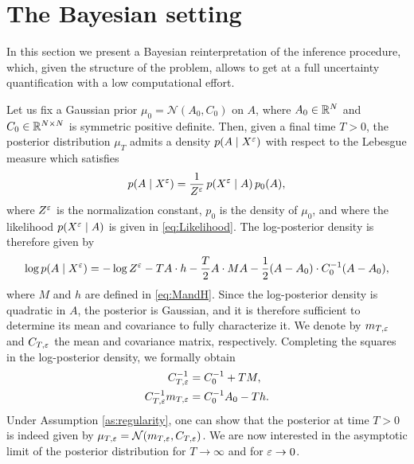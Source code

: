 \documentclass[10pt]{article}
\begin{document}
\section{The Bayesian setting}\label{sec:Bayesian}

In this section we present a Bayesian reinterpretation of the inference procedure, which, given the structure of the problem, allows to get at a full uncertainty quantification with a low computational effort. 

Let us fix a Gaussian prior $\mu_0 = \mathcal N(A_0, C_0)$ on $A$, where $A_0 \in \mathbb{R}^N$ and $C_0 \in \mathbb{R}^{N\times N}$ is symmetric positive definite. Then, given a final time $T > 0$, the posterior distribution $\mu_T$ admits a density $p(A \mid X^\varepsilon)$ with respect to the Lebesgue measure which satisfies
\begin{equation}
p(A \mid X^\varepsilon) = \frac1{Z^\varepsilon} \, p(X^\varepsilon \mid A) \, p_0(A),
\end{equation}
where $Z^\varepsilon$ is the normalization constant, $p_0$ is the density of $\mu_0$, and where the likelihood $p(X^\varepsilon \mid A)$ is given in \eqref{eq:Likelihood}. The log-posterior density is therefore given by
\begin{equation}\label{eq:Posterior}
\log p(A \mid X^\varepsilon) = -\log Z^\varepsilon - T A \cdot h - \frac{T}{2} A \cdot M A - \frac12 (A - A_0) \cdot C_0^{-1}(A-A_0),
\end{equation}
where $M$ and $h$ are defined in \eqref{eq:MandH}.
Since the log-posterior density is quadratic in $A$, the posterior is Gaussian, and it is therefore sufficient to determine its mean and covariance to fully characterize it. We denote by $m_{T,\varepsilon}$ and $C_{T,\varepsilon}$ the mean and covariance matrix, respectively. Completing the squares in the log-posterior density, we formally obtain
\begin{equation}
\begin{aligned}
C_{T,\varepsilon}^{-1} &= C_0^{-1} + T M, \\
C_{T,\varepsilon}^{-1}m_{T,\varepsilon} &= C_0^{-1}A_0 - T h. 
\end{aligned}
\end{equation}
Under Assumption \ref{as:regularity}, one can show that the posterior at time $T > 0$ is indeed given by $\mu_{T,\varepsilon} = \mathcal N(m_{T,\varepsilon}, C_{T,\varepsilon})$. We are now interested in the asymptotic limit of the posterior distribution for $T \to \infty$ and for $\varepsilon \to 0$.
\end{document}
